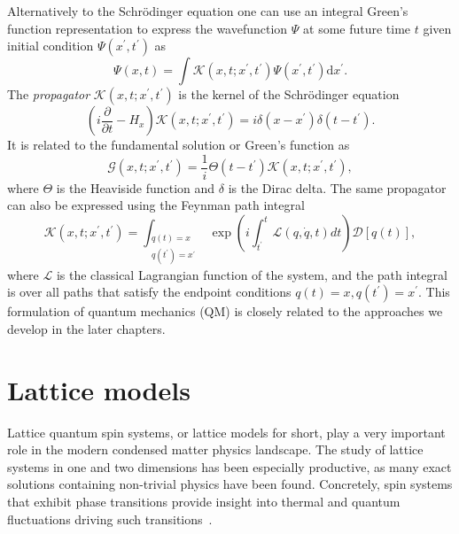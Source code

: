 Alternatively to the Schr\" odinger equation one can use an integral Green's function representation to express the wavefunction $\Psi$ at some future time $t$ given initial condition $\Psi(x^\prime, t^\prime)$ as
\begin{equation}
\Psi\left(x, t\right)=\int  \mathcal{K}\left(x, t ; x^\prime, t^\prime\right) \Psi\left(x^\prime, t^\prime\right) \mathrm{d} x^\prime.
\end{equation}
The \emph{propagator} $\mathcal{K}\left(x, t ; x^\prime, t^\prime\right)$ is the kernel of the Schr\" odinger equation
\begin{equation}
\left(i \frac{\partial}{\partial t}-H_{x}\right) \mathcal{K}\left(x, t ; x^\prime, t^\prime\right)=i \delta\left(x - x^\prime\right) \delta\left(t-t^\prime\right).
\end{equation}
It is related to the fundamental solution or Green's function as
\begin{equation}
\mathcal G\left(x, t ; x^{\prime}, t^{\prime}\right)=\frac{1}{i} \Theta\left(t-t^{\prime}\right) \mathcal K\left(x, t ; x^{\prime}, t^{\prime}\right),
\end{equation}
where $\Theta$ is the Heaviside function and $\delta$ is the Dirac delta. The same propagator can also be expressed using the Feynman path integral
\begin{equation}
\label{eq:FPI}
\mathcal{K}\left(x, t ; x^\prime, t^\prime\right)=\int_{\substack{q(t)=x \\ q(t^\prime)=x^\prime}} \exp \left(i \int_{t^\prime}^{t} \mathcal{L}(q, \dot{q}, t) d t\right)\mathcal{D}[q(t)],
\end{equation}
where $\mathcal{L}$ is the classical Lagrangian function of the system, and the path integral is over all paths that satisfy the endpoint conditions $q(t)=x, q(t^\prime)=x^\prime$. This formulation of quantum mechanics (QM) is closely related to the approaches we develop in the later chapters. 

\section{Lattice models}
\label{sec:lattice-models}
Lattice quantum spin systems, or lattice models for short, play a very important role in the modern condensed matter physics landscape. The study of lattice systems in one and two dimensions has been especially productive, as many exact solutions containing non-trivial physics have been found. Concretely, spin systems that exhibit phase transitions provide insight into thermal and quantum fluctuations driving such transitions~\cite{parkinson2010introduction}.

